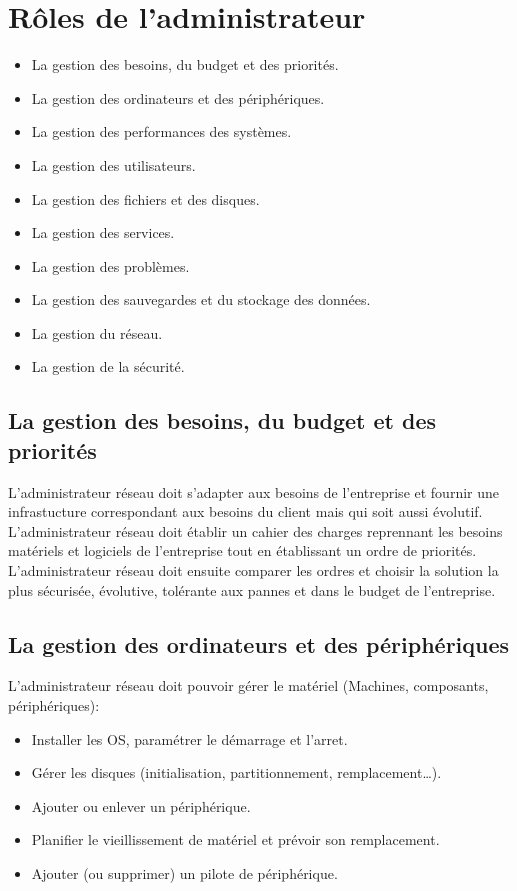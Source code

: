  \section{Rôles de l'administrateur}
 \begin{itemize}
	 \item La gestion des besoins, du budget et des priorités.
	 \item La gestion des ordinateurs et des périphériques.
	 \item La gestion des performances des systèmes.
	 \item La gestion des utilisateurs.
	 \item La gestion des fichiers et des disques.
	 \item La gestion des services.
	 \item La gestion des problèmes.
	 \item La gestion des sauvegardes et du stockage des données.
	 \item La gestion du réseau.
	 \item La gestion de la sécurité.
 \end{itemize}

 \subsection{La gestion des besoins, du budget et des priorités}
 L'administrateur réseau doit s'adapter aux besoins de l'entreprise et fournir une infrastucture correspondant aux besoins du client mais qui soit aussi évolutif.\\
 L'administrateur réseau doit établir un cahier des charges reprennant les besoins matériels et logiciels de l'entreprise tout en établissant un ordre de priorités.\\
 L'administrateur réseau doit ensuite comparer les ordres et choisir la solution la plus sécurisée, évolutive, tolérante aux pannes et dans le budget de l'entreprise.

 \subsection{La gestion des ordinateurs et des périphériques}
 L'administrateur réseau doit pouvoir gérer le matériel (Machines, composants, périphériques):
 \begin{itemize}
	 \item Installer les OS, paramétrer le démarrage et l'arret.
	 \item Gérer les disques (initialisation, partitionnement, remplacement\ldots).
	 \item Ajouter ou enlever un périphérique.
	 \item Planifier le vieillissement de matériel et prévoir son remplacement.
	 \item Ajouter (ou supprimer) un pilote de périphérique.
 \end{itemize}

